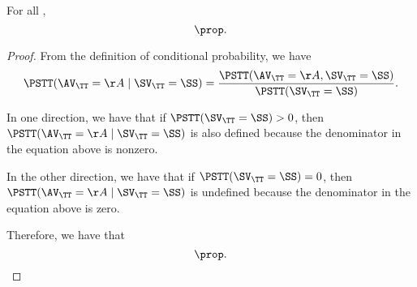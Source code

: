 \begin{proposition}
  For all \rchreqarng,
  $$\prop.$$%
\end{proposition}

\begin{proof}
  From the definition of conditional probability, we have
  $$ 
  \PSTT(\AV_\TT = \AA \mid \SV_\TT = \SS)
  = 
  \frac
  {\PSTT(\AV_\TT = \AA, \SV_\TT = \SS)}
  {\PSTT(\SV_\TT = \SS)}.$$

  In one direction, we have that if $\PSTT(\SV_\TT = \SS) > 0$, then 
  $ \PSTT(\AV_\TT = \AA \mid \SV_\TT = \SS) $
  is also defined because the denominator in the equation above is nonzero.

  In the other direction, we have that if $\PSTT(\SV_\TT = \SS) = 0$, then 
  $ \PSTT(\AV_\TT = \AA \mid \SV_\TT = \SS) $
  is undefined because the denominator in the equation above is zero.

  Therefore, we have that
  $$\prop.$$%
\end{proof}
